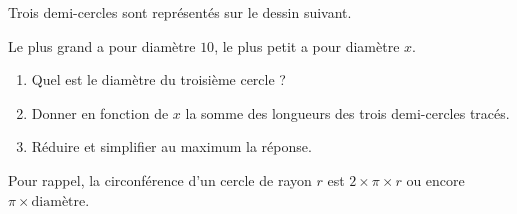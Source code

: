 
\begin{exercice}\label{exo2smath-0156}

    Trois demi-cercles sont représentés sur le dessin suivant.
\begin{center}
   
\end{center}
    Le plus grand a pour diamètre \( 10\), le plus petit a pour diamètre \( x\).
    \begin{enumerate}
        \item
            Quel est le diamètre du troisième cercle ?
        \item
            Donner en fonction de \( x\) la somme des longueurs des trois demi-cercles tracés.
        \item
            Réduire et simplifier au maximum la réponse.
    \end{enumerate}
    Pour rappel, la circonférence d'un cercle de rayon \( r\) est \( 2\times \pi\times r\) ou encore \( \pi\times \text{diamètre}\).

\end{exercice}
